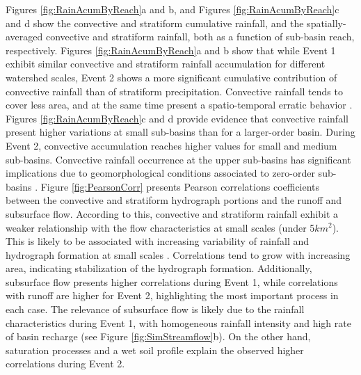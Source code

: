 \documentclass[hess, manuscript]{copernicus} %
\begin{document}
Figures \ref{fig:RainAcumByReach}a and b, and Figures \ref{fig:RainAcumByReach}c and d show the convective and stratiform cumulative rainfall, and the spatially-averaged convective and stratiform rainfall, both as a function of sub-basin reach, respectively.  Figures \ref{fig:RainAcumByReach}a and b show that while  Event 1 exhibit similar convective and stratiform rainfall accumulation for different watershed scales, Event 2 shows a more significant cumulative contribution of convective rainfall than of stratiform precipitation. Convective rainfall tends to cover less area, and at the same time present a spatio-temporal erratic behavior \citep{Steiner1995, Houze1989}. Figures \ref{fig:RainAcumByReach}c and d provide evidence that convective rainfall present higher variations at small sub-basins than for a larger-order basin. During Event 2, convective accumulation reaches higher values for small and medium sub-basins.   Convective rainfall occurrence at the upper sub-basins has significant implications due to geomorphological conditions associated to zero-order sub-basins \citep{Sidle2018}. Figure \ref{fig:PearsonCorr} presents Pearson correlations coefficients between the convective and stratiform hydrograph portions and the runoff and subsurface flow. According to this, convective and stratiform rainfall exhibit a weaker relationship with the flow characteristics at small scales (under 5$km^2$).  This is likely to be associated with increasing variability of rainfall and hydrograph formation at small scales \citep{Ayalew2014}.  Correlations tend to grow with increasing  area, indicating stabilization of the hydrograph formation. Additionally,  subsurface flow presents higher correlations during Event 1, while correlations with runoff are higher for Event 2, highlighting the most important process in each case.  The relevance of subsurface flow is likely due to the rainfall characteristics during  Event 1, with homogeneous rainfall intensity and high rate of basin recharge (see Figure \ref{fig:SimStreamflow}b).  On the other hand, saturation processes and a wet soil profile explain the observed higher correlations during Event 2. \\
\end{document}
